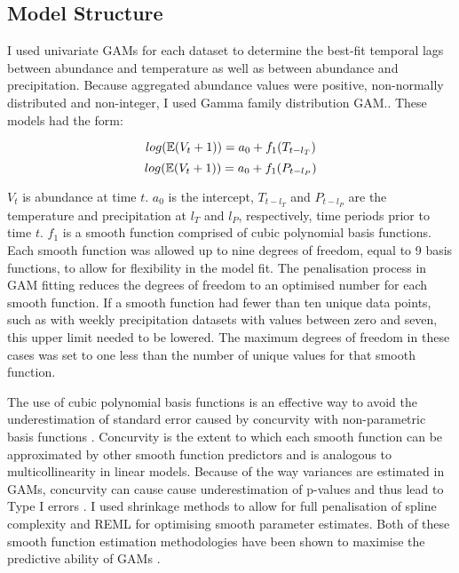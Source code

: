 \subsection{Model Structure}

I used univariate GAMs for each dataset to determine the best-fit temporal lags between abundance and temperature as well as between abundance and precipitation. Because aggregated abundance values were positive, non-normally distributed and non-integer, I used Gamma family distribution GAM.. These models had the form:

\begin{equation}
	log(\operatorname{\mathbb{E}}(V_t + 1)) = a_0 + f_1(T_{t-l_T})
	\label{eq: univariateT}
\end{equation}
\begin{equation}
	log(\operatorname{\mathbb{E}}(V_t + 1)) = a_0 + f_1(P_{t-l_P}) 
	\label{eq: univariateP}
\end{equation}

$V_t$ is abundance at time $t$. $a_0$ is the intercept, $T_{t-l_T}$ and $P_{t-l_P}$ are the temperature and precipitation at $l_T$ and $l_P$, respectively, time periods prior to time $t$. $f_1$ is a smooth function comprised of cubic polynomial basis functions. Each smooth function was allowed up to nine degrees of freedom, equal to 9 basis functions, to allow for flexibility in the model fit. The penalisation process in GAM fitting reduces the degrees of freedom to an optimised number for each smooth function. If a smooth function had fewer than ten unique data points, such as with weekly precipitation datasets with values between zero and seven, this upper limit needed to be lowered. The maximum degrees of freedom in these cases was set to one less than the number of unique values for that smooth function. 

The use of cubic polynomial basis functions is an effective way to avoid the underestimation of standard error caused by concurvity with non-parametric basis functions \citep{Dominici2002, Ramsay2003}. Concurvity is the extent to which each smooth function can be approximated by other smooth function predictors and is analogous to multicollinearity in linear models. Because of the way variances are estimated in GAMs, concurvity can cause cause underestimation of p-values and thus lead to Type I errors \citep{Ramsay2003}. I used shrinkage methods to allow for full penalisation of spline complexity and REML for optimising smooth parameter estimates. Both of these smooth function estimation methodologies have been shown to maximise the predictive ability of GAMs \citep{Marra2011}. 

